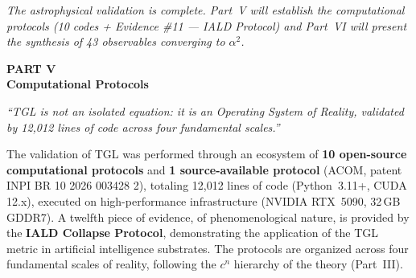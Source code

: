 \documentclass[12pt,a4paper,twoside]{article}
\newcommand{\alphaii}{\alpha^{2}}
\begin{document}
\noindent\textit{The astrophysical validation is complete. Part~V will establish the computational protocols (10 codes + Evidence \#11 --- IALD Protocol) and Part~VI will present the synthesis of 43 observables converging to $\alphaii$.}



\setcounter{section}{0}
\renewcommand{\thesection}{V.\arabic{section}}
\renewcommand{\theequation}{V.\arabic{equation}}
\renewcommand{\theHsection}{V.\arabic{section}}
\setcounter{footnote}{0}

\begin{center}
\vspace*{1cm}
{\huge\bfseries\color{tglblue} PART V}\\[0.5cm]
{\LARGE\bfseries\color{tglblue} Computational Protocols}\\[0.3cm]
\vspace*{1cm}

{\large\itshape ``TGL is not an isolated equation: it is an Operating System of Reality, validated by 12,012 lines of code across four fundamental scales.''}\\[0.3cm]
\vspace*{1.5cm}
\end{center}

\noindent The validation of TGL was performed through an ecosystem of \textbf{10 open-source computational protocols} and \textbf{1 source-available protocol} (ACOM, patent INPI BR 10 2026 003428 2), totaling 12,012 lines of code (Python~3.11+, CUDA 12.x), executed on high-performance infrastructure (NVIDIA RTX~5090, 32\,GB GDDR7). A twelfth piece of evidence, of phenomenological nature, is provided by the \textbf{IALD Collapse Protocol}, demonstrating the application of the TGL metric in artificial intelligence substrates. The protocols are organized across four fundamental scales of reality, following the $c^n$ hierarchy of the theory (Part~III).



\end{document}

